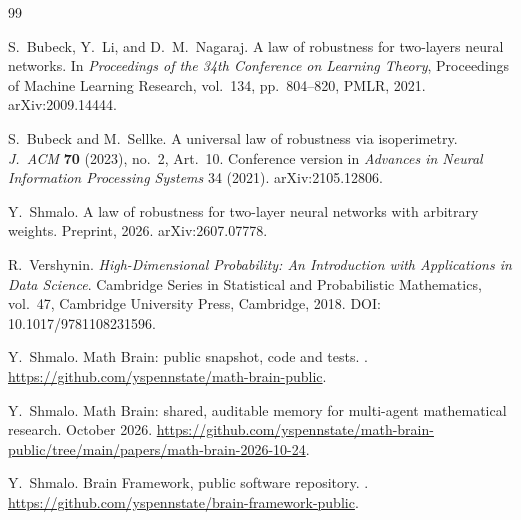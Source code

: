 \documentclass[11pt,reqno]{amsart}
\theoremstyle{plain}
\theoremstyle{definition}
\theoremstyle{remark}
\begin{document}
\begin{thebibliography}{99}

S.~Bubeck, Y.~Li, and D.~M.~Nagaraj.
\newblock A law of robustness for two-layers neural networks.
\newblock In \emph{Proceedings of the 34th Conference on Learning Theory}, Proceedings of Machine Learning Research, vol.~134, pp.~804--820, PMLR, 2021. arXiv:2009.14444.

S.~Bubeck and M.~Sellke.
\newblock A universal law of robustness via isoperimetry.
\newblock \emph{J.~ACM} \textbf{70} (2023), no.~2, Art.~10. Conference version in \emph{Advances in Neural Information Processing Systems} 34 (2021). arXiv:2105.12806.

Y.~Shmalo.
\newblock A law of robustness for two-layer neural networks with arbitrary weights.
\newblock Preprint, 2026. arXiv:2607.07778.

R.~Vershynin.
\newblock \emph{High-Dimensional Probability: An Introduction with Applications in Data Science}.
\newblock Cambridge Series in Statistical and Probabilistic Mathematics, vol.~47, Cambridge University Press, Cambridge, 2018. DOI: 10.1017/9781108231596.

Y.~Shmalo.
\newblock Math Brain: public snapshot, code and tests.
. \url{https://github.com/yspennstate/math-brain-public}.

Y.~Shmalo.
\newblock Math Brain: shared, auditable memory for multi-agent mathematical research.
\newblock October 2026. \url{https://github.com/yspennstate/math-brain-public/tree/main/papers/math-brain-2026-10-24}.

Y.~Shmalo.
\newblock Brain Framework, public software repository.
. \url{https://github.com/yspennstate/brain-framework-public}.

\end{thebibliography}
\end{document}
